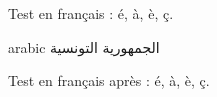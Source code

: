 \documentclass{report}
\begin{document}
Test en français : é, à, è, ç.

\begin{otherlanguage*}{arabic}
الجمهورية التونسية
\end{otherlanguage*}

Test en français après : é, à, è, ç.
\end{document}
